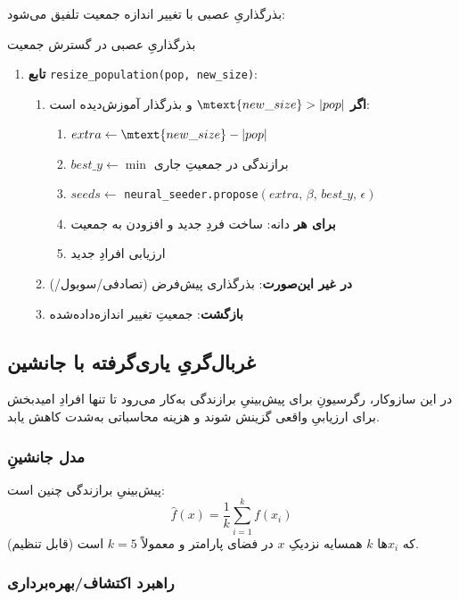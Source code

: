 بذرگذاریِ عصبی با تغییر اندازه جمعیت تلفیق می‌شود:
\begin{algorithm}
\caption{بذرگذاریِ عصبی در گسترش جمعیت}
\begin{enumerate}
\item \textbf{تابع} \texttt{resize\_population(pop, new\_size)}:
  \begin{enumerate}
  \item \textbf{اگر} \(\mtext{new\_size} > |pop|\) و بذرگذار آموزش‌دیده است:
    \begin{enumerate}
    \item \(extra \leftarrow \mtext{new\_size} - |pop|\)
    \item \(best\_y \leftarrow \min\) برازندگی در جمعیتِ جاری
    \item \(seeds \leftarrow \) \texttt{neural\_seeder.propose}\((extra,\, \beta,\, best\_y,\, \epsilon)\)
    \item \textbf{برای هر} دانه: ساخت فردِ جدید و افزودن به جمعیت
    \item ارزیابی افرادِ جدید
    \end{enumerate}
  \item \textbf{در غیر این‌صورت}: بذرگذاری پیش‌فرض (تصادفی/سوبول/)
  \item \textbf{بازگشت}: جمعیتِ تغییر اندازه‌داده‌شده
  \end{enumerate}
\end{enumerate}
\end{algorithm}

\subsection{غربال‌گریِ یاری‌گرفته با جانشین}

در این سازوکار، رگرسیونِ  برای پیش‌بینیِ برازندگی به‌کار می‌رود تا تنها افرادِ امیدبخش برای ارزیابیِ واقعی گزینش شوند و هزینه محاسباتی به‌شدت کاهش یابد.

\subsubsection{مدل جانشینِ }

پیش‌بینیِ برازندگی چنین است:
\begin{equation}\label{Eq.knn_prediction}
\hat{f}(x) = \frac{1}{k} \sum_{i=1}^{k} f(x_i)
\end{equation}
که \(x_i\)‌ها \(k\) همسایه نزدیکِ \(x\) در فضای پارامتر و معمولاً \(k=5\) است (قابل تنظیم).

\subsubsection{راهبرد اکتشاف/بهره‌برداری}

